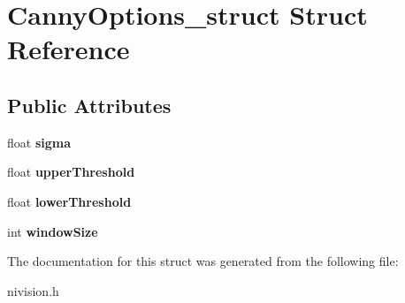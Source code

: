 \hypertarget{structCannyOptions__struct}{
\section{CannyOptions\_\-struct Struct Reference}
\label{structCannyOptions__struct}
}
\subsection*{Public Attributes}
\begin{DoxyCompactItemize}
\item 
\hypertarget{structCannyOptions__struct_a46bcb2c1ee23c48837d3ec31223e0d8e}{
float {\bfseries sigma}}
\label{structCannyOptions__struct_a46bcb2c1ee23c48837d3ec31223e0d8e}

\item 
\hypertarget{structCannyOptions__struct_a7620b3673f006ab4a486049818d17862}{
float {\bfseries upperThreshold}}
\label{structCannyOptions__struct_a7620b3673f006ab4a486049818d17862}

\item 
\hypertarget{structCannyOptions__struct_abea52e0faa61852bf00ae0787a3e5786}{
float {\bfseries lowerThreshold}}
\label{structCannyOptions__struct_abea52e0faa61852bf00ae0787a3e5786}

\item 
\hypertarget{structCannyOptions__struct_a542a198a0eff77a34f291d91ac8f817c}{
int {\bfseries windowSize}}
\label{structCannyOptions__struct_a542a198a0eff77a34f291d91ac8f817c}

\end{DoxyCompactItemize}


The documentation for this struct was generated from the following file:\begin{DoxyCompactItemize}
\item 
nivision.h\end{DoxyCompactItemize}
